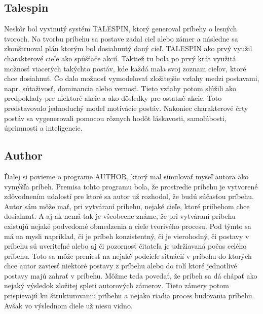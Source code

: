 \subsection{Talespin}
Neskôr bol vyvinutý systém TALESPIN\cite{talespin}, ktorý generoval príbehy o lesných tvoroch. Na tvorbu príbehu sa postave zadal cieľ alebo zámer a následne sa zkonštruoval plán ktorým bol dosiahnutý daný cieľ. TALESPIN ako prvý využil charakterové cieľe ako spúšťače akcií. Taktiež tu bola po prvý krát využitá možnosť viacerých takýchto postáv, kde každá mala svoj zoznam cieľov, ktoré chce dosiahnuť. Čo dalo možnosť vymodelovať zložitejšie vzťahy medzi postavami, napr. sútaživosť, dominancia alebo vernosť. Tieto vzťahy potom slúžili ako predpoklady pre niektoré akcie a ako dôsledky pre ostatné akcie. Toto predstavovalo jednoduchý model motivácie postáv. Nakoniec charakterové črty postáv sa vygenerovali pomocou rôznych hodôt láskavosti, samoľúbosti, úprimnosti a inteligencie.\par
\subsection{Author}
Ďalej si povieme o programe AUTHOR\cite{author}, ktorý mal simulovať myseľ autora ako vymýšľa príbeh. Premisa tohto programu bola, že prostredie príbehu je vytvorené zdôvodnením udalostí pre ktoré sa autor už rozhodol, že budú súčasťou príbehu. Autor sám môže mať, pri vytváraní príbehu, nejaké cieľe, ktoré priíbehom chce dosiahnuť. A aj ak nemá tak je všeobecne známe, že pri vytváraní príbehu existujú nejaké podvedomé obmedzenia a cieľe tvorivého procesu. Pod týmto sa má na mysli napríklad, či je príbeh konzistentný, či je vierohodný, či postavy v príbehu sú uveriteľné alebo aj či pozornosť čitateľa je udržiavaná počas celého príbehu. Toto sa môže preniesť na nejaké podcieľe situácií v príbehu do ktorých chce autor zaviesť niektoré postavy z príbehu alebo do rolí ktoré jednotlivé postavy majú zahrať v príbehu. Môžme teda povedať, že príbeh sa dá chápať ako nejaký výsledok zložitej spleti autorových zámerov. Tieto zámery potom prispievajú ku štrukturovaniu príbehu a nejako riadia proces budovania príbehu. Avšak vo výslednom diele už niesu vidno.\par

